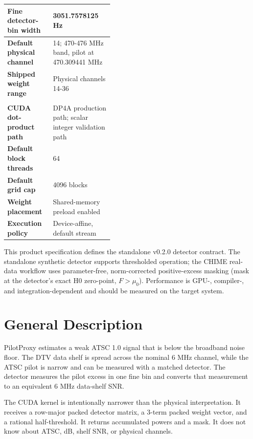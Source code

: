 \documentclass[10pt,letterpaper]{article}
\begin{document}
\begin{minipage}[t]{0.48\textwidth}
\begin{tabularx}{\linewidth}{|>{\bfseries}L{0.43\linewidth}|Y|}
Fine detector-bin width & 3051.7578125 Hz \\ \hline
Default physical channel & 14; 470-476 MHz band, pilot at 470.309441 MHz \\ \hline
Shipped weight range & Physical channels 14-36 \\ \hline
{}\\ \hline
CUDA dot-product path & DP4A production path; scalar integer validation path \\ \hline
Default block threads & 64 \\ \hline
Default grid cap & 4096 blocks \\ \hline
Weight placement & Shared-memory preload enabled \\ \hline
Execution policy & Device-affine, default stream \\ \hline
\end{tabularx}
\end{minipage}

\vfill
{\small\color{FStatGray}This product specification defines the standalone v0.2.0 detector contract.  The standalone synthetic detector supports thresholded operation; the CHIME real-data workflow uses parameter-free, norm-corrected positive-excess masking (mask at the detector's exact H0 zero-point, $F>\mu_0$).  Performance is GPU-, compiler-, and integration-dependent and should be measured on the target system.}

\newpage
\tableofcontents
\newpage

\section{General Description}

PilotProxy estimates a weak ATSC 1.0 signal that is below the broadband noise floor.  The DTV data shelf is spread across the nominal 6 MHz channel, while the ATSC pilot is narrow and can be measured with a matched detector.  The detector measures the pilot excess in one fine bin and converts that measurement to an equivalent 6 MHz data-shelf SNR.

The CUDA kernel is intentionally narrower than the physical interpretation.  It receives a row-major packed detector matrix, a 3-term packed weight vector, and a rational half-threshold.  It returns accumulated powers and a mask.  It does not know about ATSC, dB, shelf SNR, or physical channels.
\end{document}
